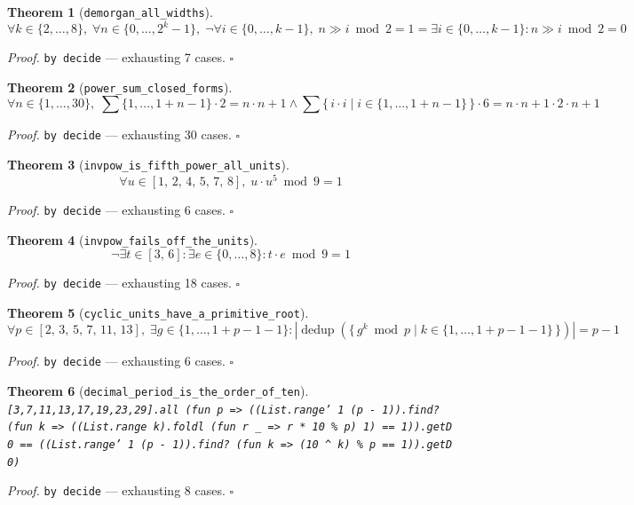 \documentclass[11pt]{article}
\newtheorem{theorem}{Theorem}[section]
\begin{document}
\begin{theorem}[\texttt{demorgan\_all\_widths}]
\[ \forall k \in \{2,\dots,8\},\; \forall n \in \{0,\dots,2^{k}-1\},\; \lnot \forall i \in \{0,\dots,k-1\},\; n \gg i \bmod 2 = 1 = \exists i \in \{0,\dots,k-1\} : n \gg i \bmod 2 = 0 \]
\end{theorem}
\noindent\emph{Proof.} \texttt{by decide} --- exhausting 7 cases. \hfill$\square$

\begin{theorem}[\texttt{power\_sum\_closed\_forms}]
\[ \forall n \in \{1,\dots,30\},\; \sum \{1,\dots,1+n-1\} \cdot 2 = n \cdot n + 1 \land \sum \{\, i \cdot i \mid i \in \{1,\dots,1+n-1\} \,\} \cdot 6 = n \cdot n + 1 \cdot 2 \cdot n + 1 \]
\end{theorem}
\noindent\emph{Proof.} \texttt{by decide} --- exhausting 30 cases. \hfill$\square$

\begin{theorem}[\texttt{invpow\_is\_fifth\_power\_all\_units}]
\[ \forall u \in [1,\,2,\,4,\,5,\,7,\,8],\; u \cdot u^{5} \bmod 9 = 1 \]
\end{theorem}
\noindent\emph{Proof.} \texttt{by decide} --- exhausting 6 cases. \hfill$\square$

\begin{theorem}[\texttt{invpow\_fails\_off\_the\_units}]
\[ \lnot \exists t \in [3,\,6] : \exists e \in \{0,\dots,8\} : t \cdot e \bmod 9 = 1 \]
\end{theorem}
\noindent\emph{Proof.} \texttt{by decide} --- exhausting 18 cases. \hfill$\square$

\begin{theorem}[\texttt{cyclic\_units\_have\_a\_primitive\_root}]
\[ \forall p \in [2,\,3,\,5,\,7,\,11,\,13],\; \exists g \in \{1,\dots,1+p - 1-1\} : \left|\operatorname{dedup}\left(\{\, g^{k} \bmod p \mid k \in \{1,\dots,1+p - 1-1\} \,\}\right)\right| = p - 1 \]
\end{theorem}
\noindent\emph{Proof.} \texttt{by decide} --- exhausting 6 cases. \hfill$\square$

\begin{theorem}[\texttt{decimal\_period\_is\_the\_order\_of\_ten}]
\texttt{[3,7,11,13,17,19,23,29].all (fun p => ((List.range' 1 (p - 1)).find? (fun k => ((List.range k).foldl (fun r \_ => r * 10 \% p) 1) == 1)).getD 0 == ((List.range' 1 (p - 1)).find? (fun k => (10 ^ k) \% p == 1)).getD 0)}
\end{theorem}
\noindent\emph{Proof.} \texttt{by decide} --- exhausting 8 cases. \hfill$\square$
\end{document}
